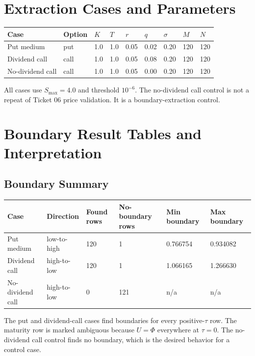 \documentclass[11pt,a4paper]{article}
\begin{document}
\section{Extraction Cases and Parameters}

\begin{longtable}{L{0.24\textwidth}L{0.10\textwidth}L{0.08\textwidth}L{0.08\textwidth}L{0.08\textwidth}L{0.08\textwidth}L{0.09\textwidth}L{0.08\textwidth}L{0.08\textwidth}}
\toprule
Case & Option & \(K\) & \(T\) & \(r\) & \(q\) & \(\sigma\) & \(M\) & \(N\) \\
\midrule
\endhead
Put medium & put & 1.0 & 1.0 & 0.05 & 0.02 & 0.20 & 120 & 120 \\
Dividend call & call & 1.0 & 1.0 & 0.05 & 0.08 & 0.20 & 120 & 120 \\
No-dividend call & call & 1.0 & 1.0 & 0.05 & 0.00 & 0.20 & 120 & 120 \\
\bottomrule
\end{longtable}

All cases use \(S_{\max}=4.0\) and threshold \(10^{-6}\). The no-dividend call control is not a
repeat of Ticket 06 price validation. It is a boundary-extraction control.

\section{Boundary Result Tables and Interpretation}

\subsection{Boundary Summary}

\begin{longtable}{L{0.25\textwidth}L{0.12\textwidth}L{0.13\textwidth}L{0.13\textwidth}L{0.12\textwidth}L{0.12\textwidth}}
\toprule
Case & Direction & Found rows & No-boundary rows & Min boundary & Max boundary \\
\midrule
\endhead
Put medium & low-to-high & 120 & 1 & 0.766754 & 0.934082 \\
Dividend call & high-to-low & 120 & 1 & 1.066165 & 1.266630 \\
No-dividend call & high-to-low & 0 & 121 & n/a & n/a \\
\bottomrule
\end{longtable}

The put and dividend-call cases find boundaries for every positive-\(\tau\) row. The maturity row
is marked ambiguous because \(U=\Phi\) everywhere at \(\tau=0\). The no-dividend call control finds
no boundary, which is the desired behavior for a control case.
\end{document}
